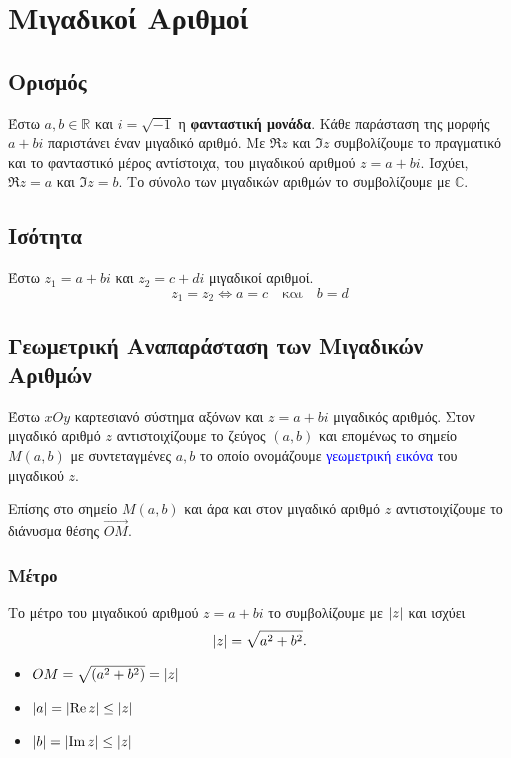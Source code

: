 
\everymath{\displaystyle}


\section{Μιγαδικοί Αριθμοί}

\subsection*{Ορισμός}

  Έστω $a,b \in \mathbb{R}$ και $i=\sqrt{-1}$ η
  \textbf{φανταστική μονάδα}. Κάθε
  παράσταση της μορφής $a+bi$ παριστάνει έναν {\color{blue} μιγαδικό αριθμό}.
  Με  $\Re z$ και $\Im z$ συμβολίζουμε το {\color{blue} πραγματικό} και το
  {\color{blue} φανταστικό} μέρος αντίστοιχα, του μιγαδικού αριθμού $z=a+bi$.
  Ισχύει,  $\Re z=a$ και $\Im z=b$.
  Το σύνολο των μιγαδικών αριθμών το συμβολίζουμε με $\mathbb{C}$.


  \subsection*{Ισότητα}

   Έστω $z_{1}=a+bi$ και $z_{2}=c+di$ μιγαδικοί αριθμοί.
  \[
    z_{1}=z_{2}\Leftrightarrow a=c \quad \text{και} \quad b=d
  \]


  \subsection*{Γεωμετρική Αναπαράσταση των Μιγαδικών Αριθμών}

  Έστω $xOy$ καρτεσιανό σύστημα αξόνων και $z=a+bi$ μιγαδικός αριθμός. Στον μιγαδικό αριθμό $z$  αντιστοιχίζουμε το ζεύγος $(a,b)$ και επομένως το σημείο $M(a,b)$ με συντεταγμένες $a,b$ το οποίο ονομάζουμε \textcolor{blue}{γεωμετρική εικόνα} του μιγαδικού $z$.

  Επίσης στο σημείο $M(a,b)$ και άρα και στον μιγαδικό αριθμό $z$ αντιστοιχίζουμε το διάνυσμα θέσης $\vec{OM}$.

  \subsubsection*{Μέτρο}

  Το {\color{blue} μέτρο} του μιγαδικού αριθμού $z=a+bi$ το
  συμβολίζουμε με $\abs{z}$ και ισχύει
\[
  \abs{z}=\sqrt{a^2+b^2}.
\]

  \begin{itemize}
    \item   $OM=\sqrt{(a^{2}+b^{2})}=\abs{z}$
    \item   $\abs{a}=\abs{\Re z}\leq \abs{z}$
    \item   $\abs{b}=\abs{\Im z}\leq \abs{z}$
  \end{itemize}

